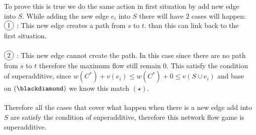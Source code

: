 \documentclass{article}
\newcommand*\circled[1]{\tikz[baseline=(char.base)]{
            \node[shape=circle,draw,inner sep=2pt] (char) {#1};}}
\begin{document}
To prove this is true we do the same action in first situation by add new edge into $S$.
While adding the new edge $e_i$ into $S$ there will have $2$ cases will happen:\\
$\circled{1}$ : This new edge creates a path from $s$ to $t$. than this can link back to the first situation.\\\\
$\circled{2}$ : This new edge cannot create the path. In this case since there are no path from $s$ to $t$ therefore the maximum flow still remain $0$. This satisfy the condition of superadditive, since $w(C^*) + v(e_i) \leq w(C^*) + 0 \leq v(S \cup e_i)$ and base on $(\blackdiamond)$ we know this match $(\star)$.\\\\
Therefore all the cases that cover what happen when there is a new edge add into $S$ are satisfy the condition of superadditive, therefore this network flow game is superadditive.
\newpage
\end{document}
